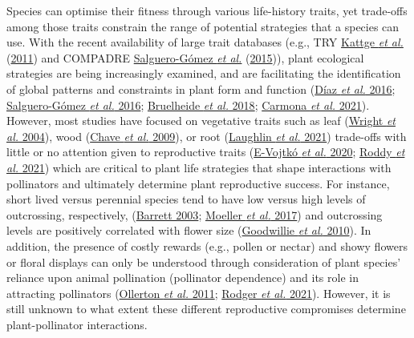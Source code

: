 \documentclass[
  12pt,
  a4paper,
]{article}
\begin{document}
Species can optimise their fitness through various life-history traits, yet trade-offs among those traits constrain the range of potential strategies that a species can use. With the recent availability of large trait databases (e.g., TRY \protect\hyperlink{ref-kattge2011}{Kattge \emph{et al.}} (\protect\hyperlink{ref-kattge2011}{2011}) and COMPADRE \protect\hyperlink{ref-salguero2015}{Salguero-Gómez \emph{et al.}} (\protect\hyperlink{ref-salguero2015}{2015})), plant ecological strategies are being increasingly examined, and are facilitating the identification of global patterns and constraints in plant form and function (\protect\hyperlink{ref-diaz2016}{Díaz \emph{et al.} 2016}; \protect\hyperlink{ref-salguero2016}{Salguero-Gómez \emph{et al.} 2016}; \protect\hyperlink{ref-bruelheide2018}{Bruelheide \emph{et al.} 2018}; \protect\hyperlink{ref-carmona2021}{Carmona \emph{et al.} 2021}). However, most studies have focused on vegetative traits such as leaf (\protect\hyperlink{ref-wright2004}{Wright \emph{et al.} 2004}), wood (\protect\hyperlink{ref-chave2009}{Chave \emph{et al.} 2009}), or root (\protect\hyperlink{ref-laughlin2021}{Laughlin \emph{et al.} 2021}) trade-offs with little or no attention given to reproductive traits (\protect\hyperlink{ref-evojtko2020}{E-Vojtkó \emph{et al.} 2020}; \protect\hyperlink{ref-roddy2021}{Roddy \emph{et al.} 2021}) which are critical to plant life strategies that shape interactions with pollinators and ultimately determine plant reproductive success. For instance, short lived versus perennial species tend to have low versus high levels of outcrossing, respectively, (\protect\hyperlink{ref-barrett2003}{Barrett 2003}; \protect\hyperlink{ref-moeller2017}{Moeller \emph{et al.} 2017}) and outcrossing levels are positively correlated with flower size (\protect\hyperlink{ref-goodwillie2010}{Goodwillie \emph{et al.} 2010}). In addition, the presence of costly rewards (e.g., pollen or nectar) and showy flowers or floral displays can only be understood through consideration of plant species' reliance upon animal pollination (pollinator dependence) and its role in attracting pollinators (\protect\hyperlink{ref-ollerton2011}{Ollerton \emph{et al.} 2011}; \protect\hyperlink{ref-rodger2021}{Rodger \emph{et al.} 2021}). However, it is still unknown to what extent these different reproductive compromises determine plant-pollinator interactions.
\end{document}

